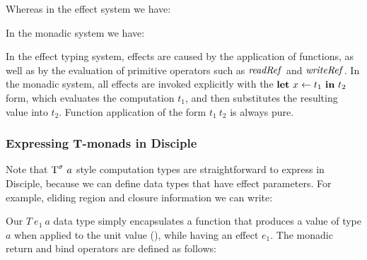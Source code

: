 Whereas in the effect system we have:


In the monadic system we have:


In the effect typing system, effects are caused by the application of functions, as well as by the evaluation of primitive operators such as $\operatorname{\mathit{readRef}}$ and $\operatorname{\mathit{writeRef}}$.  In the monadic system, all effects are invoked explicitly with the $\textrm{\textbf{let}} \ x \gets t_1 \ \textrm{\textbf{in}} \ t_2$ form, which evaluates the computation $t_1$, and then substitutes the resulting value into $t_2$. Function application of the form $t_1 \ t_2$ is always pure.

\subsubsection{Expressing T-monads in Disciple}
Note that $\textrm{T}^\sigma \ a$ style computation types are straightforward to express in Disciple, because we can define data types that have effect parameters. For example, eliding region and closure information we can write:


Our $T \ e_1 \ a$ data type simply encapsulates a function that produces a value of type $a$ when applied to the unit value (), while having an effect $e_1$. The monadic return and bind operators are defined as follows:


